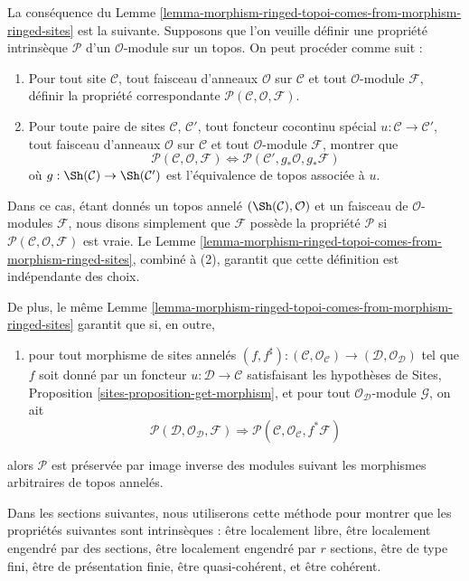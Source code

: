 \medskip\noindent
La conséquence du Lemme
\ref{lemma-morphism-ringed-topoi-comes-from-morphism-ringed-sites} est la
suivante. Supposons que l'on veuille définir une propriété intrinsèque
$\mathcal{P}$ d'un $\mathcal{O}$-module sur un topos. On peut procéder comme
suit :
\begin{enumerate}
\item Pour tout site $\mathcal{C}$, tout faisceau d'anneaux $\mathcal{O}$ sur
$\mathcal{C}$ et tout $\mathcal{O}$-module $\mathcal{F}$, définir la propriété
correspondante $\mathcal{P}(\mathcal{C}, \mathcal{O}, \mathcal{F})$.
\item Pour toute paire de sites $\mathcal{C}$, $\mathcal{C}'$, tout foncteur
cocontinu spécial $u : \mathcal{C} \to \mathcal{C}'$, tout faisceau d'anneaux
$\mathcal{O}$ sur $\mathcal{C}$ et tout $\mathcal{O}$-module $\mathcal{F}$,
montrer que
$$
\mathcal{P}(\mathcal{C}, \mathcal{O}, \mathcal{F})
\Leftrightarrow
\mathcal{P}(\mathcal{C}', g_*\mathcal{O}, g_*\mathcal{F})
$$
où $g : \Sh(\mathcal{C}) \to \Sh(\mathcal{C}')$ est l'équivalence de topos
associée à $u$.
\end{enumerate}
Dans ce cas, étant donnés un topos annelé
$(\Sh(\mathcal{C}), \mathcal{O})$ et un faisceau de $\mathcal{O}$-modules
$\mathcal{F}$, nous disons simplement que $\mathcal{F}$ possède la
propriété $\mathcal{P}$ si
$\mathcal{P}(\mathcal{C}, \mathcal{O}, \mathcal{F})$ est vraie. Le Lemme
\ref{lemma-morphism-ringed-topoi-comes-from-morphism-ringed-sites}, combiné à
(2), garantit que cette définition est indépendante des choix.

\medskip\noindent
De plus, le même Lemme
\ref{lemma-morphism-ringed-topoi-comes-from-morphism-ringed-sites} garantit que
si, en outre,
\begin{enumerate}
\item[(3)] pour tout morphisme de sites annelés
$(f, f^\sharp) :
(\mathcal{C}, \mathcal{O}_\mathcal{C})
\to
(\mathcal{D}, \mathcal{O}_\mathcal{D})$
tel que $f$ soit donné par un foncteur
$u : \mathcal{D} \to \mathcal{C}$ satisfaisant les hypothèses de Sites,
Proposition \ref{sites-proposition-get-morphism}, et pour tout
$\mathcal{O}_\mathcal{D}$-module $\mathcal{G}$, on ait
$$
\mathcal{P}(\mathcal{D}, \mathcal{O}_\mathcal{D}, \mathcal{F})
\Rightarrow
\mathcal{P}(\mathcal{C}, \mathcal{O}_\mathcal{C}, f^*\mathcal{F})
$$
\end{enumerate}
alors $\mathcal{P}$ est préservée par image inverse des modules suivant les
morphismes arbitraires de topos annelés.

\medskip\noindent
Dans les sections suivantes, nous utiliserons cette méthode pour montrer que les
propriétés suivantes sont intrinsèques : être localement libre, être localement
engendré par des sections, être localement engendré par $r$ sections, être de
type fini, être de présentation finie, être quasi-cohérent, et être cohérent.

